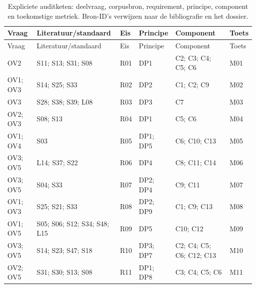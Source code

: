 \begin{longtable}{@{}P{.105\linewidth}P{.26\linewidth}P{.065\linewidth}P{.12\linewidth}P{.21\linewidth}P{.07\linewidth}@{}}
\caption{Expliciete auditketen: deelvraag, corpusbron, requirement, principe, component en toekomstige metriek. Bron-ID’s verwijzen naar de bibliografie en het dossier.}\label{tab:trace}\\
\toprule Vraag & Literatuur/standaard & Eis & Principe & Component & Toets \\ \midrule\endfirsthead
\toprule Vraag & Literatuur/standaard & Eis & Principe & Component & Toets \\ \midrule\endhead
OV2 & S11;\allowbreak{} S13;\allowbreak{} S31;\allowbreak{} S08 & R01 & DP1 & C2;\allowbreak{} C3;\allowbreak{} C4;\allowbreak{} C5;\allowbreak{} C6 & M01 \\
OV1;\allowbreak{} OV3 & S14;\allowbreak{} S25;\allowbreak{} S33 & R02 & DP2 & C1;\allowbreak{} C2;\allowbreak{} C9 & M02 \\
OV3 & S28;\allowbreak{} S38;\allowbreak{} S39;\allowbreak{} L08 & R03 & DP3 & C7 & M03 \\
OV2;\allowbreak{} OV3 & S08;\allowbreak{} S13 & R04 & DP1 & C5;\allowbreak{} C6 & M04 \\
OV1;\allowbreak{} OV4 & S03 & R05 & DP1;\allowbreak{} DP5 & C6;\allowbreak{} C10;\allowbreak{} C13 & M05 \\
OV3;\allowbreak{} OV5 & L14;\allowbreak{} S37;\allowbreak{} S22 & R06 & DP4 & C8;\allowbreak{} C11;\allowbreak{} C14 & M06 \\
OV3;\allowbreak{} OV5 & S04;\allowbreak{} S33 & R07 & DP2;\allowbreak{} DP4 & C9;\allowbreak{} C11 & M07 \\
OV1;\allowbreak{} OV3 & S25;\allowbreak{} S21;\allowbreak{} S33 & R08 & DP2;\allowbreak{} DP9 & C1;\allowbreak{} C9;\allowbreak{} C13 & M08 \\
OV1;\allowbreak{} OV5 & S05;\allowbreak{} S06;\allowbreak{} S12;\allowbreak{} S34;\allowbreak{} S48;\allowbreak{} L15 & R09 & DP5 & C10;\allowbreak{} C12 & M09 \\
OV3;\allowbreak{} OV5 & S14;\allowbreak{} S23;\allowbreak{} S47;\allowbreak{} S18 & R10 & DP3;\allowbreak{} DP7 & C2;\allowbreak{} C4;\allowbreak{} C5;\allowbreak{} C6;\allowbreak{} C12;\allowbreak{} C13 & M10 \\
OV2;\allowbreak{} OV5 & S31;\allowbreak{} S30;\allowbreak{} S13;\allowbreak{} S08 & R11 & DP1;\allowbreak{} DP8 & C3;\allowbreak{} C4;\allowbreak{} C5;\allowbreak{} C6 & M11 \\

\end{longtable}
